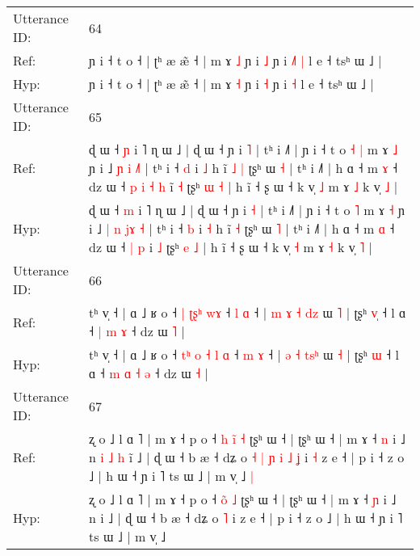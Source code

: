 \documentclass[10pt]{article}
\DeclareRobustCommand{\hl}[1]{{\textcolor{red}{#1}}}
\begin{document}
\begin{longtable}{ll}
 \\
\midrule
Utterance ID: & 64 \\
Ref: & ɲ i ˧ t o ˧ | ʈʰ æ æ̃ ˧ | m ɤ \hl{˩} ɲ i \hl{˩} ɲ i\hl{ }\hl{˩}\hl{˥} \hl{|} l e ˧ tsʰ ɯ ˩ |
 \\
Hyp: & ɲ i ˧ t o ˧ | ʈʰ æ æ̃ ˧ | m ɤ \hl{˧} ɲ i \hl{˧} ɲ i\hl{}\hl{}\hl{} \hl{˧} l e ˧ tsʰ ɯ ˩ |
 \\
\midrule
Utterance ID: & 65 \\
Ref: & ɖ ɯ ˧ \hl{ɲ} i ˥ ɳ ɯ ˩ | ɖ ɯ ˧ ɲ i \hl{˥} | tʰ i ˩˥ | ɲ i ˧ t o\hl{ }\hl{˧} \hl{|} m ɤ \hl{˩} ɲ i ˩ \hl{ɲ} \hl{i} \hl{}\hl{}\hl{˩}\hl{˥} | tʰ i ˧ \hl{d} i \hl{˩} h ĩ\hl{ }\hl{˩} \hl{|} ʈʂʰ ɯ \hl{˧} | tʰ i ˩˥ | h ɑ ˧ m \hl{ɤ} ˧ dz ɯ ˧\hl{ }\hl{p}\hl{ }\hl{i} \hl{˧} \hl{h} i\hl{̃} \hl{˧} ʈʂʰ \hl{ɯ} \hl{˧} | h ĩ ˧ ʂ ɯ ˧ k v̩ \hl{˩} m ɤ \hl{˩} k v̩ \hl{˩} |
 \\
Hyp: & ɖ ɯ ˧ \hl{m} i ˥ ɳ ɯ ˩ | ɖ ɯ ˧ ɲ i \hl{˧} | tʰ i ˩˥ | ɲ i ˧ t o\hl{}\hl{} \hl{˥} m ɤ \hl{˧} ɲ i ˩ \hl{|} \hl{n} \hl{j}\hl{ɤ}\hl{ }\hl{˧} | tʰ i ˧ \hl{b} i \hl{˧} h ĩ\hl{}\hl{} \hl{˧} ʈʂʰ ɯ \hl{˥} | tʰ i ˩˥ | h ɑ ˧ m \hl{ɑ} ˧ dz ɯ ˧\hl{}\hl{}\hl{}\hl{} \hl{|} \hl{p} i\hl{} \hl{˩} ʈʂʰ \hl{e} \hl{˩} | h ĩ ˧ ʂ ɯ ˧ k v̩ \hl{˧} m ɤ \hl{˧} k v̩ \hl{˥} |
 \\
\midrule
Utterance ID: & 66 \\
Ref: & tʰ v̩ ˧ | ɑ ˩ ʁ o ˧ \hl{}\hl{|} \hl{ʈ}\hl{ʂ}\hl{ʰ} \hl{}\hl{w}\hl{ɤ} ˧ \hl{l} \hl{ɑ} ˧ | \hl{m} \hl{ɤ} \hl{˧}\hl{ }\hl{d}\hl{z} ɯ \hl{˥} | ʈʂʰ \hl{v}\hl{̩} ˧ l ɑ ˧\hl{}\hl{} \hl{|} \hl{m} \hl{ɤ} ˧ dz ɯ \hl{˥} |
 \\
Hyp: & tʰ v̩ ˧ | ɑ ˩ ʁ o ˧ \hl{t}\hl{ʰ} \hl{o}\hl{ }\hl{˧} \hl{l}\hl{ }\hl{ɑ} ˧ \hl{m} \hl{ɤ} ˧ | \hl{ə} \hl{˧} \hl{}\hl{t}\hl{s}\hl{ʰ} ɯ \hl{˧} | ʈʂʰ \hl{}\hl{ɯ} ˧ l ɑ ˧\hl{ }\hl{m} \hl{ɑ} \hl{˧} \hl{ə} ˧ dz ɯ \hl{˧} |
 \\
\midrule
Utterance ID: & 67 \\
Ref: & ʐ o ˩ l ɑ ˥ | m ɤ ˧ p o ˧\hl{ }\hl{h} \hl{i}̃ \hl{˧} ʈʂʰ ɯ ˧ | ʈʂʰ ɯ ˧ | m ɤ ˧ \hl{n} i ˩ n\hl{ }\hl{i}\hl{ }\hl{˩}\hl{ }\hl{h} i\hl{̃} ˩ | ɖ ɯ ˧ b æ ˧ dʑ o\hl{ }\hl{˧}\hl{ }\hl{|}\hl{ }\hl{ɲ}\hl{ }\hl{i}\hl{ }\hl{˩} \hl{ʝ} i\hl{ }\hl{˧} z e ˧ | p i ˧ z o ˩ | h ɯ ˧ ɲ i ˥ ts ɯ ˩ | m v̩ ˩\hl{ }\hl{|}
 \\
Hyp: & ʐ o ˩ l ɑ ˥ | m ɤ ˧ p o ˧\hl{}\hl{} \hl{o}̃ \hl{˩} ʈʂʰ ɯ ˧ | ʈʂʰ ɯ ˧ | m ɤ ˧ \hl{ɲ} i ˩ n\hl{}\hl{}\hl{}\hl{}\hl{}\hl{} i\hl{} ˩ | ɖ ɯ ˧ b æ ˧ dʑ o\hl{}\hl{}\hl{}\hl{}\hl{}\hl{}\hl{}\hl{}\hl{}\hl{} \hl{˥} i\hl{}\hl{} z e ˧ | p i ˧ z o ˩ | h ɯ ˧ ɲ i ˥ ts ɯ ˩ | m v̩ ˩\hl{}\hl{}
 \\

\end{longtable}
\end{document}
